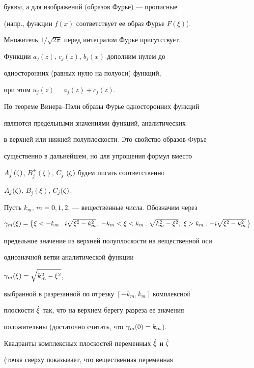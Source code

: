 буквы, а для изображений (образов Фурье) --- прописные


(напр., функции $f(x)$ соответствует ее образ Фурье $F(\xi)$).


Множитель $1/\sqrt{2\pi}$ перед интегралом Фурье присутствует.





Функции $a_j(z)$, $c_j(z)$, $b_j(x)$ дополним нулем до


односторонних (равных нулю на полуоси) функций,


при этом $u_j(z)=a_j(z)+c_j(z)$.


По теореме Винера--Пэли образы Фурье односторонних функций


являются предельными значениями функций, аналитических


в верхней или нижней полуплоскости. Это свойство образов Фурье


существенно в дальнейшем, но для упрощения формул вместо


$A^+_j(\zeta)$, $B^+_j(\xi)$, $C^-_j(\zeta)$ будем писать соответственно


$A_j(\zeta)$, $B_j(\xi)$, $C_j(\zeta)$.





Пусть $k_m$, $m=0,1,2$, --- вещественные числа. Обозначим через


$$


\ga_m(\xi) = \big\{


\xi< -k_m : i\sqrt{\xi^2-k_m^2};\


-k_m< \xi< k_m : \sqrt{k_m^2-\xi^2};\


\xi> k_m : -i\sqrt{\xi^2-k_m^2}\,\big\}


$$


предельное значение из верхней полуплоскости на вещественной оси


однозначной ветви аналитической функции


$\gamma_m(\Dot{\xi})=\sqrt{k_m^2-\Dot{\xi}^2}$,


выбранной в разрезанной по отрезку $[-k_m,k_m]$ комплексной


плоскости $\Dot{\xi}$ так, что на верхнем берегу разреза ее значения


положительны (достаточно считать, что $\gamma_m(0)=k_m$).





Квадранты комплексных плоскостей переменных $\Dot{\xi}$ и $\Dot{\zeta}$


(точка сверху показывает, что вещественная переменная


